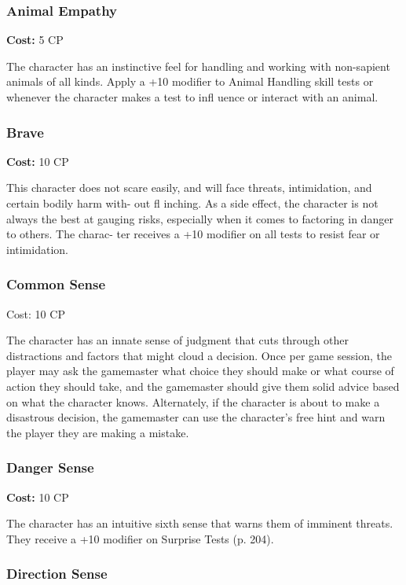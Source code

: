 \subsubsection{Animal Empathy}

\textbf{Cost:} 5 CP

The character has an instinctive feel for handling 
and working with non-sapient animals of all kinds. 
Apply a +10 modifier to Animal Handling skill tests 
or whenever the character makes a test to infl uence or 
interact with an animal.

\subsubsection{Brave}

\textbf{Cost:} 10 CP

This character does not scare easily, and will face 
threats, intimidation, and certain bodily harm with-
out fl inching. As a side effect, the character is not 
always the best at gauging risks, especially when it 
comes to factoring in danger to others. The charac-
ter receives a +10 modifier on all tests to resist fear 
or intimidation.

\subsubsection{Common Sense}

Cost: 10 CP

The character has an innate sense of judgment that 
cuts through other distractions and factors that might 
cloud a decision. Once per game session, the player 
may ask the gamemaster what choice they should 
make or what course of action they should take, and 
the gamemaster should give them solid advice based 
on what the character knows. Alternately, if the 
character is about to make a disastrous decision, the 
gamemaster can use the character's free hint and warn 
the player they are making a mistake.

\subsubsection{Danger Sense}

\textbf{Cost:} 10 CP

The character has an intuitive sixth sense that warns 
them of imminent threats. They receive a +10 modifier 
on Surprise Tests (p. 204).

\subsubsection{Direction Sense}

